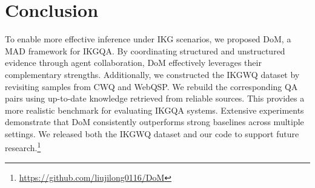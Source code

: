 \section{Conclusion}

To enable more effective inference under IKG scenarios, we proposed DoM, a MAD framework for IKGQA. By coordinating structured and unstructured evidence through agent collaboration, DoM effectively leverages their complementary strengths. Additionally, we constructed the IKGWQ dataset by revisiting samples from CWQ and WebQSP. We rebuild the corresponding QA pairs using up-to-date knowledge retrieved from reliable sources. This provides a more realistic benchmark for evaluating IKGQA systems. Extensive experiments demonstrate that DoM consistently outperforms strong baselines across multiple settings. We released both the IKGWQ dataset and our code to support future research.\footnote[3]{\url{https://github.com/liujilong0116/DoM}}